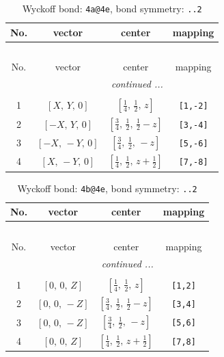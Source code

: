 \documentclass[fleqn,8pt]{jsarticle}
\begin{document}
\begin{longtable}{cccc}
\caption{Wyckoff bond: {\tt 4a@4e}, bond symmetry: {\tt ..2}}
 \\
 \hline \hline
No. & vector & center & mapping \\ \hline \endfirsthead

\multicolumn{3}{l}{\tablename\ \thetable{}} \\
 \hline \hline
No. & vector & center & mapping \\ \hline \endhead

 \hline \hline
\multicolumn{3}{r}{\footnotesize\it continued ...} \\ \endfoot

 \hline \hline
\multicolumn{3}{r}{} \\ \endlastfoot

1 & $\left[ X,\, Y,\, 0 \right]$ & $\left[ \frac{1}{4},\, \frac{1}{2},\, z \right]$ & {\tt [1,-2]} \\ \hline
2 & $\left[ - X,\, Y,\, 0 \right]$ & $\left[ \frac{3}{4},\, \frac{1}{2},\, \frac{1}{2} - z \right]$ & {\tt [3,-4]} \\ \hline
3 & $\left[ - X,\, - Y,\, 0 \right]$ & $\left[ \frac{3}{4},\, \frac{1}{2},\, - z \right]$ & {\tt [5,-6]} \\ \hline
4 & $\left[ X,\, - Y,\, 0 \right]$ & $\left[ \frac{1}{4},\, \frac{1}{2},\, z + \frac{1}{2} \right]$ & {\tt [7,-8]} \\
\end{longtable}
\renewcommand{\arraystretch}{1.2}
\begin{longtable}{cccc}
\caption{Wyckoff bond: {\tt 4b@4e}, bond symmetry: {\tt ..2}}
 \\
 \hline \hline
No. & vector & center & mapping \\ \hline \endfirsthead

\multicolumn{3}{l}{\tablename\ \thetable{}} \\
 \hline \hline
No. & vector & center & mapping \\ \hline \endhead

 \hline \hline
\multicolumn{3}{r}{\footnotesize\it continued ...} \\ \endfoot

 \hline \hline
\multicolumn{3}{r}{} \\ \endlastfoot

1 & $\left[ 0,\, 0,\, Z \right]$ & $\left[ \frac{1}{4},\, \frac{1}{2},\, z \right]$ & {\tt [1,2]} \\ \hline
2 & $\left[ 0,\, 0,\, - Z \right]$ & $\left[ \frac{3}{4},\, \frac{1}{2},\, \frac{1}{2} - z \right]$ & {\tt [3,4]} \\ \hline
3 & $\left[ 0,\, 0,\, - Z \right]$ & $\left[ \frac{3}{4},\, \frac{1}{2},\, - z \right]$ & {\tt [5,6]} \\ \hline
4 & $\left[ 0,\, 0,\, Z \right]$ & $\left[ \frac{1}{4},\, \frac{1}{2},\, z + \frac{1}{2} \right]$ & {\tt [7,8]} \\
\end{longtable}
\end{document}
